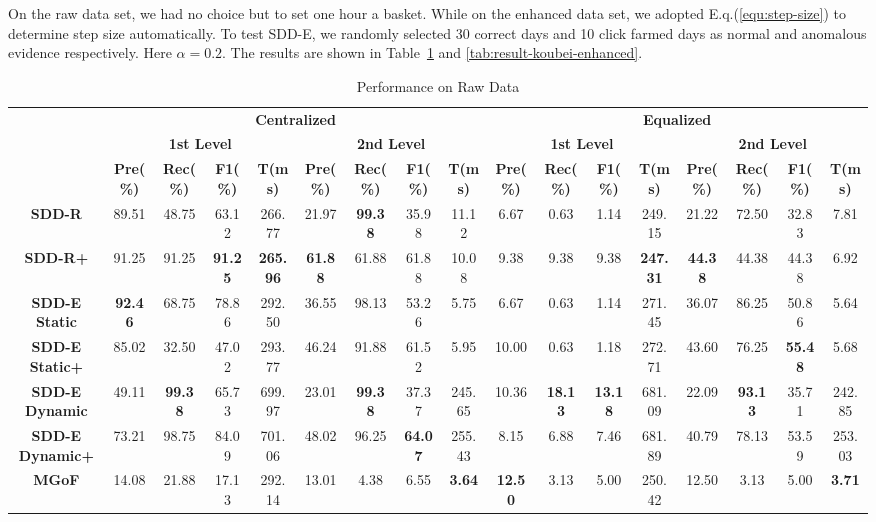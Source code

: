 \documentclass[10pt,conference,letterpaper]{article}
\begin{document}
			On the raw data set, we had no choice but to set one hour a basket. While on the enhanced data set, we adopted E.q.(\ref{equ:step-size}) to determine step size automatically.
			To test SDD-E, we randomly selected 30 correct days and 10 click farmed days as normal and anomalous evidence respectively.
			Here $\alpha = 0.2$. The results are shown in Table~\ref{tab:result-koubei-raw} and \ref{tab:result-koubei-enhanced}.
			
			\begin{table}
				\centering
				\caption{Performance on Raw Data}
				\label{tab:result-koubei-raw}
				\footnotesize
				\begin{tabular}{|c|c|c|c|c|c|c|c|c|c|c|c|c|c|c|c|c|}
					\hline
					\multirow{3}{*}{\textbf{}} & \multicolumn{8}{c|}{\textbf{Centralized}} & \multicolumn{8}{c|}{\textbf{Equalized}} \\ \cline{2-17} 
					& \multicolumn{4}{c|}{\textbf{1st Level}} & \multicolumn{4}{c|}{\textbf{2nd Level}} & \multicolumn{4}{c|}{\textbf{1st Level}} & \multicolumn{4}{c|}{\textbf{2nd Level}} \\ \cline{2-17} 
					& \textbf{Pre(\%)} & \textbf{Rec(\%)} & \textbf{F1(\%)} & \textbf{T(ms)} & \textbf{Pre(\%)} & \textbf{Rec(\%)} & \textbf{F1(\%)} & \textbf{T(ms)} & \textbf{Pre(\%)} & \textbf{Rec(\%)} & \textbf{F1(\%)} & \textbf{T(ms)} & \textbf{Pre(\%)} & \textbf{Rec(\%)} & \textbf{F1(\%)} & \textbf{T(ms)} \\ \hline
					\textbf{SDD-R} & 89.51 & 48.75 & 63.12 & 266.77 & 21.97 & \textbf{99.38} & 35.98 & 11.12 & 6.67 & 0.63 & 1.14 & 249.15 & 21.22 & 72.50 & 32.83 & 7.81 \\ \hline
					\textbf{SDD-R+} & 91.25 & 91.25 & \textbf{91.25} & \textbf{265.96} & \textbf{61.88} & 61.88 & 61.88 & 10.08 & 9.38 & 9.38 & 9.38 & \textbf{247.31} & \textbf{44.38} & 44.38 & 44.38 & 6.92 \\ \hline
					\textbf{SDD-E Static} & \textbf{92.46} & 68.75 & 78.86 & 292.50 & 36.55 & 98.13 & 53.26 & 5.75 & 6.67 & 0.63 & 1.14 & 271.45 & 36.07 & 86.25 & 50.86 & 5.64 \\ \hline
					\textbf{SDD-E Static+} & 85.02 & 32.50 & 47.02 & 293.77 & 46.24 & 91.88 & 61.52 & 5.95 & 10.00 & 0.63 & 1.18 & 272.71 & 43.60 & 76.25 & \textbf{55.48} & 5.68 \\ \hline
					\textbf{SDD-E Dynamic} & 49.11 & \textbf{99.38} & 65.73 & 699.97 & 23.01 & \textbf{99.38} & 37.37 & 245.65 & 10.36 & \textbf{18.13} & \textbf{13.18} & 681.09 & 22.09 & \textbf{93.13} & 35.71 & 242.85 \\ \hline
					\textbf{SDD-E Dynamic+} & 73.21 & 98.75 & 84.09 & 701.06 & 48.02 & 96.25 & \textbf{64.07} & 255.43 & 8.15 & 6.88 & 7.46 & 681.89 & 40.79 & 78.13 & 53.59 & 253.03 \\ \hline
					\textbf{MGoF} & 14.08 & 21.88 & 17.13 & 292.14 & 13.01 & 4.38 & 6.55 & \textbf{3.64} & \textbf{12.50} & 3.13 & 5.00 & 250.42 & 12.50 & 3.13 & 5.00 & \textbf{3.71} \\ \hline
				\end{tabular}
				

\end{table}
\end{document}
